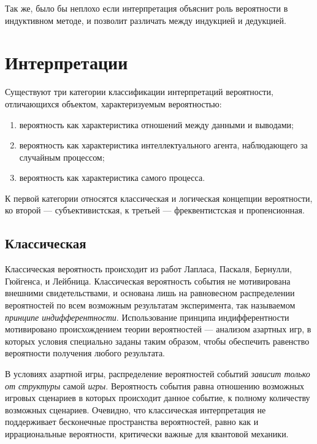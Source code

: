 \documentclass[14pt]{extarticle}
\begin{document}
Так же, было бы неплохо если интерпретация объяснит роль вероятности в индуктивном методе, и позволит различать между индукцией и дедукцией.

\section{Интерпретации}

Существуют три категории классификации интерпретаций вероятности, отличающихся объектом, характеризуемым вероятностью:
\begin{enumerate}
\item вероятность как характеристика отношений между данными и выводами;
\item вероятность как характеристика интеллектуального агента, наблюдающего за случайным процессом;
\item вероятность как характеристика самого процесса.
\end{enumerate}

К первой категории относятся классическая и логическая концепции вероятности, ко второй --- субъективистская, к третьей --- фреквентистская и пропенсионная.

\subsection{Классическая}

Классическая вероятность происходит из работ Лапласа, Паскаля, Бернулли, Гюйгенса, и Лейбница. Классическая вероятность события не мотивирована внешними свидетельствами, и основана лишь на равновесном распределении вероятностей по всем возможным результатам эксперимента, так называемом \emph{принципе индифферентности}. Использование принципа индифферентности мотивировано происхождением теории вероятностей --- анализом азартных игр, в которых условия специально заданы таким образом, чтобы обеспечить равенство вероятности получения любого результата. 

В условиях азартной игры, распределение вероятностей событий \emph{зависит только от структуры} самой \emph{игры}. Вероятность события равна отношению возможных игровых сценариев в которых происходит данное событие, к полному количеству возможных сценариев. Очевидно, что классическая интерпретация не поддерживает бесконечные пространства вероятностей, равно как и иррациональные вероятности, критически важные для квантовой механики.\\
\end{document}
